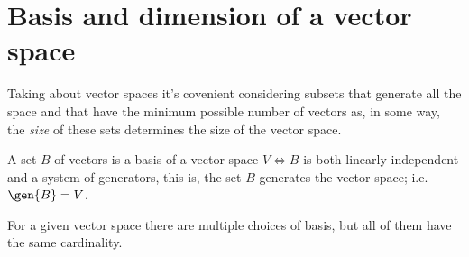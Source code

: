 



\section{Basis and dimension of a vector space}
Taking about vector spaces it's covenient considering subsets that generate all the space and that have 
the minimum possible number of vectors as, in some way, the \textit{size} of these sets determines the size 
of the vector space.

\begin{defi}[Basis]
    A set $B$ of vectors is a basis of a vector space $V\iff B$ is both linearly independent and a system of
    generators, this is, the set $B$ generates the vector space; i.e. $\gen{B} = V$.
\end{defi}

\begin{remark}
    For a given vector space there are multiple choices of basis, but all of them have the same cardinality.
\end{remark}

